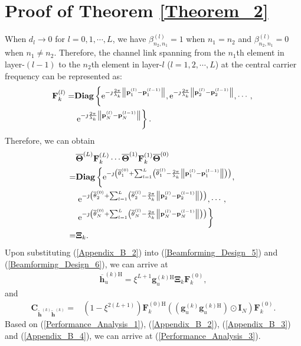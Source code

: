\documentclass[lettersize,journal]{IEEEtran}
\theoremstyle{remark}
\begin{document}
\section{Proof of Theorem \ref{Theorem_2}}\label{Appendix_B}
When $d_l\rightarrow 0$ for $l=0,1,\cdots,L$, we have $\beta_{n_2,n_1}^{(l)}=1$ when $n_1=n_2$ and $\beta_{n_2,n_1}^{(l)}=0$ when $n_1\neq n_2$. Therefore, the channel link spanning from the $n_1$th element in layer-$(l-1)$ to the $n_2$th element in layer-$l$ ($l=1,2,\cdots,L$) at the central carrier frequency can be represented as:
\begin{align}\label{Appendix_B_1}
    \notag\mathbf{F}_k^{(l)}=&\mathbf{Diag}
    \left\{\mathrm{e}^{-\jmath \frac{2\pi}{\lambda_k}\left\|\mathbf{p}_{1}^{(l)}
    -\mathbf{p}_{1}^{(l-1)}\right\|},
    \mathrm{e}^{-\jmath \frac{2\pi}{\lambda_k}\left\|\mathbf{p}_{2}^{(l)}
    -\mathbf{p}_{2}^{(l-1)}\right\|},\cdots,\right.\\
    &\left.\mathrm{e}^{-\jmath \frac{2\pi}{\lambda_k}\left\|\mathbf{p}_{N}^{(l)}
    -\mathbf{p}_{N}^{(l-1)}\right\|}\right\}.
\end{align}
Therefore, we can obtain
\begin{align}\label{Appendix_B_2}
    \notag&\overline{\mathbf{\Theta}}^{(L)}\mathbf{F}_k^{(L)}
     \cdots\overline{\mathbf{\Theta}}^{(1)}\mathbf{F}_k^{(1)}\overline{\mathbf{\Theta}}^{(0)}\\
    \notag=&\mathbf{Diag}
    \left\{\mathrm{e}^{-\jmath \left(\overline{\theta}_1^{(0)}
    +\sum_{l=1}^{L}\left(\overline{\theta}_1^{(l)}-\frac{2\pi}{\lambda_k}\left\|\mathbf{p}_{1}^{(l)}
    -\mathbf{p}_{1}^{(l-1)}\right\|\right)\right)},\right.\\
    \notag&\left.\mathrm{e}^{-\jmath \left(\overline{\theta}_2^{(0)}
    +\sum_{l=1}^{L}\left(\overline{\theta}_2^{(l)}-\frac{2\pi}{\lambda_k}\left\|\mathbf{p}_{2}^{(l)}
    -\mathbf{p}_{2}^{(l-1)}\right\|\right)\right)},\cdots,\right.\\
    \notag&\left.\mathrm{e}^{-\jmath \left(\overline{\theta}_N^{(0)}
    +\sum_{l=1}^{L}\left(\overline{\theta}_N^{(l)}-\frac{2\pi}{\lambda_k}\left\|\mathbf{p}_{N}^{(l)}
    -\mathbf{p}_{N}^{(l-1)}\right\|\right)\right)}\right\}\\
    =&\mathbf{\Xi}_k.
\end{align}
Upon substituting (\ref{Appendix_B_2}) into (\ref{Beamforming_Design_5}) and (\ref{Beamforming_Design_6}), we can arrive at
\begin{align}\label{Appendix_B_3}
    \overline{\mathbf{h}}_u^{(k)\mathrm{H}}=\xi^{L+1}\mathbf{g}_u^{(k)\mathrm{H}}
    \mathbf{\Xi}_k\mathbf{F}_k^{(0)},
\end{align}
and
\begin{align}\label{Appendix_B_4}
    \mathbf{C}_{\widetilde{\mathbf{h}}^{(k)}\widetilde{\mathbf{h}}^{(k)}}
    =&\left(1-\xi^{2(L+1)}\right)\mathbf{F}_k^{(0)\mathrm{H}}
    \left(\left(\mathbf{g}_u^{(k)}\mathbf{g}_u^{(k)\mathrm{H}}\right)
    \odot\mathbf{I}_N\right)\mathbf{F}_k^{(0)}.
\end{align}
Based on (\ref{Performance_Analysis_1}), (\ref{Appendix_B_2}), (\ref{Appendix_B_3}) and (\ref{Appendix_B_4}), we can arrive at (\ref{Performance_Analysis_3}).



\end{document}
